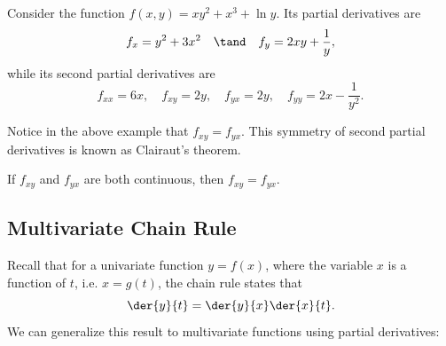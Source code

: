 \begin{example}
    Consider the function $f(x, y) = xy^2 + x^3 + \ln y$. Its partial derivatives are \[f_x = y^2 + 3x^2 \quad \tand \quad f_y = 2xy + \frac1y,\] while its second partial derivatives are \[f_{xx} = 6x, \quad f_{xy} = 2y, \quad f_{yx} = 2y, \quad f_{yy} = 2x  - \frac1{y^2}.\]
\end{example}

Notice in the above example that $f_{xy} = f_{yx}$. This symmetry of second partial derivatives is known as Clairaut's theorem.

\begin{theorem}
    If $f_{xy}$ and $f_{yx}$ are both continuous, then $f_{xy} = f_{yx}$.
\end{theorem}

\subsection{Multivariate Chain Rule}

Recall that for a univariate function $y = f(x)$, where the variable $x$ is a function of $t$, i.e. $x = g(t)$, the chain rule states that \[\der{y}{t} = \der{y}{x} \der{x}{t}.\] We can generalize this result to multivariate functions using partial derivatives:

